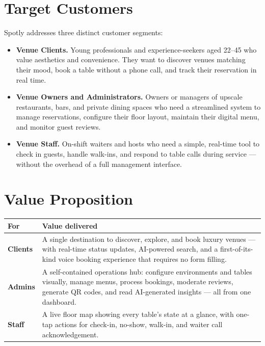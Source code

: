 \documentclass[12pt,a4paper,oneside]{report}
\begin{document}
\section{Target Customers}

Spotly addresses three distinct customer segments:

\begin{itemize}[leftmargin=2em, topsep=4pt, itemsep=3pt]
  \item \textbf{Venue Clients.} Young professionals and experience-seekers aged
        22--45 who value aesthetics and convenience. They want to discover venues
        matching their mood, book a table without a phone call, and track their
        reservation in real time.

  \item \textbf{Venue Owners and Administrators.} Owners or managers of
        upscale restaurants, bars, and private dining spaces who need a
        streamlined system to manage reservations, configure their floor layout,
        maintain their digital menu, and monitor guest reviews.

  \item \textbf{Venue Staff.} On-shift waiters and hosts who need a simple,
        real-time tool to check in guests, handle walk-ins, and respond to
        table calls during service --- without the overhead of a full management
        interface.
\end{itemize}

\section{Value Proposition}

\begin{tabularx}{\linewidth}{>{\bfseries}lX}
  \toprule
  For & Value delivered \\
  \midrule
  Clients &
    A single destination to discover, explore, and book luxury venues ---
    with real-time status updates, AI-powered search, and a first-of-its-kind
    voice booking experience that requires no form filling. \\
  \addlinespace
  Admins &
    A self-contained operations hub: configure environments and tables
    visually, manage menus, process bookings, moderate reviews, generate QR
    codes, and read AI-generated insights --- all from one dashboard. \\
  \addlinespace
  Staff &
    A live floor map showing every table's state at a glance, with one-tap
    actions for check-in, no-show, walk-in, and waiter call acknowledgement. \\
  \bottomrule
\end{tabularx}
\end{document}
